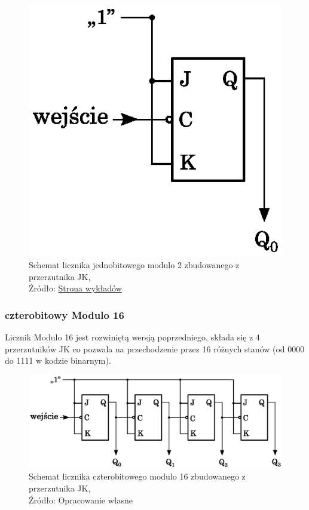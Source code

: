 \documentclass{article}
\begin{document}
        \begin{figure}[!ht]
          \centering
          \includegraphics[scale=0.55]{grafiki/Licznik_JK_mod_2.eps}
          \caption{Schemat licznika jednobitowego modulo 2 zbudowanego z przerzutnika JK,
          \\Źródło: \href{https://spe.if.uj.edu.pl/literatura}{Strona wykładów}}
        \end{figure}

      \subsubsection{czterobitowy Modulo 16}
        Licznik Modulo 16 jest rozwiniętą wersją poprzedniego, składa się z 4 przerzutników JK co pozwala na przechodzenie przez 16 różnych stanów (od 0000 do 1111 w kodzie binarnym).
        \begin{figure}[!ht]
          \centering
          \includegraphics[scale=0.55]{grafiki/Licznik_JK_mod_16.eps}
          \caption{Schemat licznika czterobitowego modulo 16 zbudowanego z przerzutnika JK,
          \\Źródło: Opracowanie własne}
          \label{fig3:mod16}
        \end{figure}
        \pagebreak
\end{document}
